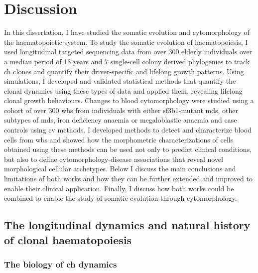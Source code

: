 \chapter{Discussion}

In this dissertation, I have studied the somatic evolution and cytomorphology of the haematopoietic system. To study the somatic evolution of haematopoiesis, I used longitudinal targeted sequencing data from over 300 elderly individuals over a median period of 13 years and 7 single-cell colony derived phylogenies to track \ac{ch} clones and quantify their driver-specific and lifelong growth patterns. Using simulations, I developed and validated statistical methods that quantify the clonal dynamics using these types of data and applied them, revealing lifelong clonal growth behaviours. Changes to blood cytomorphology were studied using a cohort of over 300 \ac{wbs} from individuals with either \ac{sf3b1}-mutant \ac{mds}, other subtypes of \ac{mds}, iron deficiency anaemia or megaloblastic anaemia and case controls using \ac{cv} methods. I developed methods to detect and characterize blood cells from \ac{wbs} and showed how the morphometric characterizations of cells obtained using these methods can be used not only to predict clinical conditions, but also to define cytomorphology-disease associations that reveal novel morphological cellular archetypes. Below I discuss the main conclusions and limitations of both works and how they can be further extended and improved to enable their clinical application. Finally, I discuss how both works could be combined to enable the study of somatic evolution through cytomorphology.

\section{The longitudinal dynamics and natural history of clonal haematopoiesis} 

\subsection{The biology of \ac{ch} dynamics}


